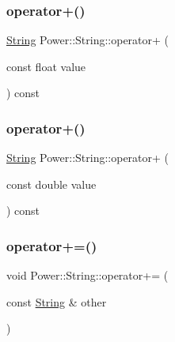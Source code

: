 \mbox{\label{class_power_1_1_string_a011603e62e9254d7b2a95314ddaca716}} 
\subsubsection{\texorpdfstring{operator+()}{operator+()}\hspace{0.1cm}{\footnotesize\ttfamily [10/11]}}
{\footnotesize\ttfamily \hyperlink{class_power_1_1_string}{String} Power\+::\+String\+::operator+ (\begin{DoxyParamCaption}\item[{const float}]{value }\end{DoxyParamCaption}) const\hspace{0.3cm}{\ttfamily [inline]}}

\mbox{\label{class_power_1_1_string_a0957d2856d8e5693a49fef4812629459}} 
\subsubsection{\texorpdfstring{operator+()}{operator+()}\hspace{0.1cm}{\footnotesize\ttfamily [11/11]}}
{\footnotesize\ttfamily \hyperlink{class_power_1_1_string}{String} Power\+::\+String\+::operator+ (\begin{DoxyParamCaption}\item[{const double}]{value }\end{DoxyParamCaption}) const\hspace{0.3cm}{\ttfamily [inline]}}

\mbox{\label{class_power_1_1_string_aad7a34466104387cc33cafcf04770b39}} 
\subsubsection{\texorpdfstring{operator+=()}{operator+=()}\hspace{0.1cm}{\footnotesize\ttfamily [1/11]}}
{\footnotesize\ttfamily void Power\+::\+String\+::operator+= (\begin{DoxyParamCaption}\item[{const \hyperlink{class_power_1_1_string}{String} \&}]{other }\end{DoxyParamCaption})\hspace{0.3cm}{\ttfamily [inline]}}

